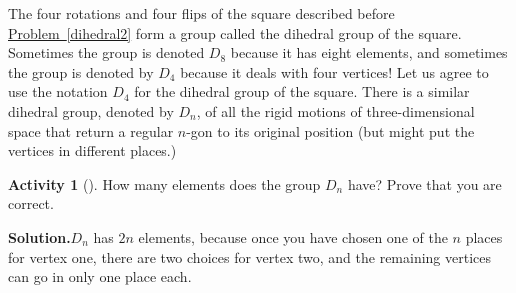 \documentclass[10pt,]{book}
\theoremstyle{plain}
\theoremstyle{definition}
\newtheorem{activity}[project]{Activity}
\numberwithin{equation}{chapter}
\begin{document}
The four rotations and four flips of the square described before \hyperref[dihedral2]{Problem~\ref{dihedral2}} form a group called the dihedral group of the square. Sometimes the group is denoted \(D_8\) because it has eight elements, and sometimes the group is denoted by \(D_4\) because it deals with four vertices! Let us agree to use the notation \(D_4\) for the dihedral group of the square. There is a similar dihedral group, denoted by \(D_{n}\), of all the rigid motions of three-dimensional space that return a regular \(n\)-gon to its original position (but might put the vertices in different places.)%
\begin{activity}[]\label{activity-249}
How many elements does the group \(D_n\) have? Prove that you are correct.%
\par\medskip\noindent%
\textbf{Solution.}\quad \(D_n\) has \(2n\) elements, because once you have chosen one of the \(n\) places for vertex one, there are two choices for vertex two, and the remaining vertices can go in only one place each.%
\end{activity}
\typeout{************************************************}
\typeout{************************************************}
\end{document}
